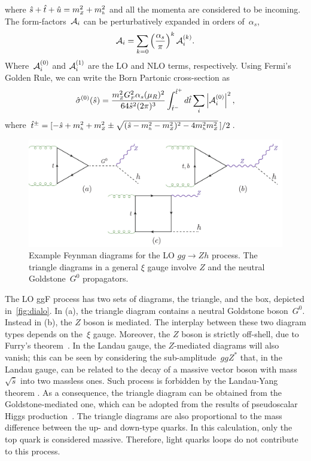 where $\hat{s}+\hat{t}+\hat{u}=m_{ \scriptscriptstyle Z}^2+m_{ \scriptscriptstyle h}^2$ and all the momenta are considered to
be incoming. 
The form-factors~${\cal A}_i$ can be perturbatively expanded in orders of~$\alpha_s$, 
\begin{equation}
	{\cal A}_{i} = \sum_{k=0} \left(\frac{\alpha_s}{\pi} \right) ^k {\cal A}_i^{(k)}.
	\label{eq:ampexp}
\end{equation}
Where~${\cal A}_i^{(0)}$ and ${\cal A}_i^{(1)}$ are the LO and NLO terms, respectively. Using Fermi's Golden Rule, we can write the Born Partonic cross-section as \\
\begin{equation}
	\hat{\sigma}^{(0)}(\hat{s})=
	\frac{m_{ \scriptscriptstyle Z}^2 G_{ \scriptscriptstyle F}^2 \alpha_s(\mu_R)^2}{64 \hat{s}^2(2\pi)^3}
	\int^{\hat{t}^+}_{\hat{t}^-}d\hat{t}\sum_i \left|{\cal A}_i^{(0)}\right|^2,
\end{equation}
where
$\hat{t}^\pm=[-\hat{s}+m_{ \scriptscriptstyle h}^2+m_{ \scriptscriptstyle Z}^2\pm\sqrt{(\hat{s}-m_{ \scriptscriptstyle h}^2-m_{ \scriptscriptstyle Z}^2)^2-4m_{ \scriptscriptstyle h}^2m_{ \scriptscriptstyle Z}^2}\,]/2$.
\begin{figure}
	\begin{center}
		\includegraphics[width=12cm]{./figures/Feynman_LO}
		\caption{Example Feynman diagrams for the LO $gg \to Zh$ process. The triangle diagrams in a general $\xi$ gauge involve $Z$ and the neutral Goldstone~$G^0$ propagators. }
		\label{fig:dialo}
	\end{center}
\end{figure}
\par  The LO ggF process has two sets of diagrams, the triangle, and the box, depicted in~\autoref{fig:dialo}. In (a), the triangle diagram contains a neutral Goldstone boson~$G^0$. Instead in (b), the $Z$ boson is mediated. The interplay between these two diagram types depends on the~$\xi$ gauge. Moreover, the $Z$ boson is strictly off-shell, due to Furry's theorem~\cite{PhysRev.51.125}.
In the Landau gauge, the $Z$-mediated diagrams will also vanish; this can be seen by considering the sub-amplitude~$ggZ^*$ that, in the Landau gauge, can be related to the decay of a massive vector boson
with mass $\sqrt{\hat{s}}$ into two massless ones. Such process is
forbidden by the Landau-Yang theorem \cite{Landau:1948kw, Yang:1950rg}. As a consequence, the triangle diagram can be obtained from the Goldstone-mediated one, which can be adopted from the results of pseudoscalar Higgs production~\cite{Spira:1995rr,Aglietti:2006tp}. 
The triangle diagrams are also proportional to the mass difference between the up- and down-type quarks. In this calculation, only the top quark is considered massive. Therefore, light quarks loops do not contribute to this process.

